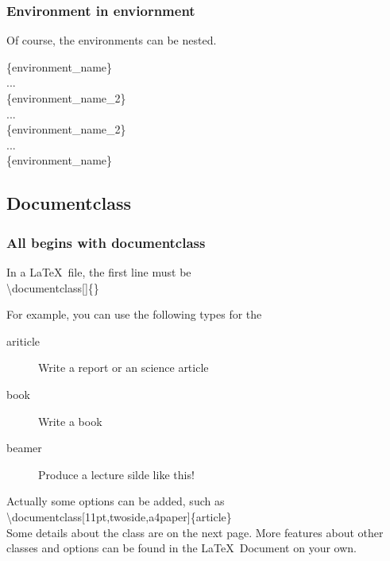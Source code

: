 \documentclass{beamer}
\begin{document}
\begin{frame}
	\frametitle{Environment in enviornment}
	Of course, the environments can be nested.\\
	\begin{example}
		\{\alert{environment\_name}\}\\
		\qquad ...\\
		\qquad{}\{\alert{environment\_name\_2}\}\\
		\qquad\qquad ...\\
		\qquad{}\{\alert{environment\_name\_2}\}\\
		\qquad ...\\
		\{\alert{environment\_name}\}\\
	\end{example}
\end{frame}


\subsection{Documentclass}

\begin{frame}
	\frametitle{All begins with documentclass}
	\begin{definition}
		In a \LaTeX\ file, the {\color{blue}first} line must be \\
		\alert{\textbackslash documentclass}[]\{\}
	\end{definition}
	For example, you can use the following types for the \\
	\begin{description}
		\item[ariticle]	Write a report or an science article
		\item[book] 	Write a book
		\item[beamer]	Produce a lecture silde like this!
	\end{description}
	Actually some options can be added, such as\\[0.5em]
	\alert{\textbackslash documentclass}[11pt,twoside,a4paper]\{article\}\\[0.5em]
	Some details about the  class are on the next page. More features about other classes and options can be found in the \LaTeX\ Document on your own.
\end{frame}
\end{document}

